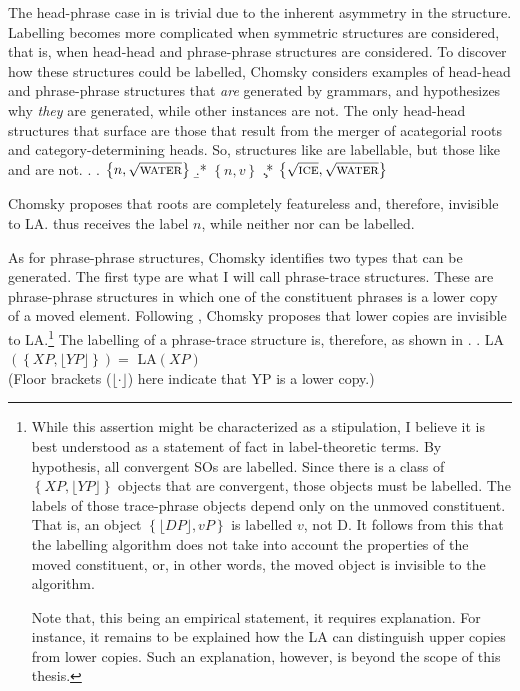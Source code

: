 The head-phrase case in \Last is trivial due to the inherent asymmetry in the structure.
Labelling becomes more complicated when symmetric structures are considered, that is, when head-head and phrase-phrase structures are considered.
To discover how these structures could be labelled, Chomsky considers examples of head-head and phrase-phrase structures that \textit{are} generated by grammars, and hypothesizes why \textit{they} are generated, while other instances are not.
The only head-head structures that surface are those that result from the merger of acategorial roots and category-determining heads.
So, structures like \Next[a] are labellable, but those like \Next[b] and \Next[c] are not.
\ex.
\a. $\left\{ n, \sqrt{\textsc{water}}\right\}$
\b.* $\left\{ n, v\right\}$
\c.* $\left\{ \sqrt{\textsc{ice}}, \sqrt{\textsc{water}} \right\}$

Chomsky proposes that roots are completely featureless and, therefore, invisible to LA.
\Last[a] thus receives the label $n$, while neither \Last[b] nor \Last[c] can be labelled.

As for phrase-phrase structures, Chomsky identifies two types that can be generated.
The first type are what I will call phrase-trace structures.
These are phrase-phrase structures in which one of the constituent phrases is a lower copy of a moved element.
Following \textcite{moro2000dynamic}, Chomsky proposes that lower copies are invisible to LA.\footnote{
	While this assertion might be characterized as a stipulation, I believe it is best understood as a statement of fact in label-theoretic terms.
	By hypothesis, all convergent SOs are labelled.
	Since there is a class of $\left\{XP, \lfloor YP\rfloor \right\}$ objects that are convergent, those objects must be labelled.
	The labels of those trace-phrase objects depend only on the unmoved constituent.
	That is, an object $\left\{ \lfloor DP\rfloor, vP \right\}$ is labelled $v$, not D.
	It follows from this that the labelling algorithm does not take into account the properties of the moved constituent, or, in other words, the moved object is invisible to the algorithm.

	Note that, this being an empirical statement, it requires explanation.
	For instance, it remains to be explained how the LA can distinguish upper copies from lower copies.
	Such an explanation, however, is beyond the scope of this thesis.
}
The labelling of a phrase-trace structure is, therefore, as shown in \Next.
\ex. LA$(\left\{ XP, \lfloor YP\rfloor \right\}) =$ LA$(XP)$\\
(Floor brackets ($\lfloor\cdot\rfloor$) here indicate that YP is a lower copy.)

